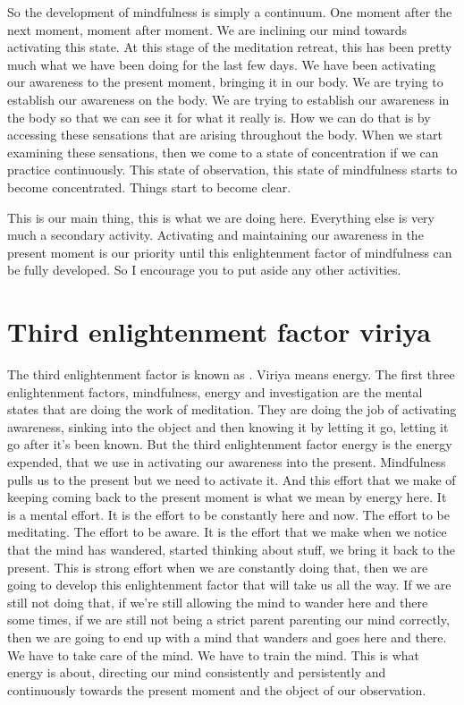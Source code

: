 \documentclass[letterpaper,10pt,english]{sphinxmanual}
\begin{document}
\sphinxAtStartPar
So  the  development  of  mindfulness  is  simply  a  continuum.  One
moment after the next moment, moment after moment. We are inclining our
mind  towards  activating  this  state. At  this  stage  of  the  meditation  retreat,
this has been pretty much what we have been doing for the last few days.
We have been activating our awareness to the present moment, bringing it
in our body. We are trying to establish our awareness on the body. We are
trying to establish our awareness in the body so that we can see it for what it
really is. How we can do that is by accessing these sensations that are arising throughout the body. When we start examining these sensations, then we
come to a state of concentration if we can practice continuously. This state of
observation, this state of mindfulness starts to become concentrated. Things
start to become clear.

\sphinxAtStartPar
{}
This is our main thing, this is what we are doing here.
Everything else is very much a secondary activity. Activating and maintaining our awareness in the present moment is our priority until this enlightenment factor of mindfulness can be fully developed. So I encourage you to
put aside any other activities.


\section{Third enlightenment factor viriya}
\label{\detokenize{3-b:third-enlightenment-factor-viriya}}
\sphinxAtStartPar
The third enlightenment factor is known as
. Viriya
means  energy.  The  first  three  enlightenment  factors,  mindfulness,  energy
and  investigation  are  the  mental  states  that  are  doing  the  work  of  meditation. They are doing the job of activating awareness, sinking into the object
and then knowing it by letting it go, letting it go after it’s been known. But
the third enlightenment factor energy is the energy expended, that we use in
activating our awareness into the present. Mindfulness pulls us to the present
but we need to activate it. And this effort that we make of keeping coming
back to the present moment is what we mean by energy here. It is a mental
effort. It is the effort to be constantly here and now. The effort to be meditating. The effort to be aware. It is the effort that we make when we notice
that the mind has wandered, started thinking about stuff, we bring it back
to the present. This is strong effort when we are constantly doing that, then
we are going to develop this enlightenment factor that will take us all the
way. If we are still not doing that, if we’re still allowing the mind to wander
here and there some times, if we are still not being a strict parent parenting
our mind correctly, then we are going to end up with a mind that wanders
and goes here and there. We have to take care of the mind. We have to train
the mind. This is what energy is about, directing our mind consistently and
persistently and continuously towards the present moment and the object of
our observation.
\end{document}
